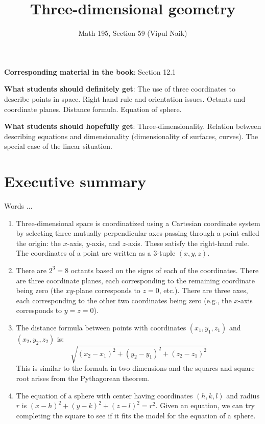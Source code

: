 \documentclass[10pt]{amsart}
\title{Three-dimensional geometry}
\author{Math 195, Section 59 (Vipul Naik)}
\begin{document}
\maketitle

{\bf Corresponding material in the book}: Section 12.1

{\bf What students should definitely get}: The use of three
coordinates to describe points in space. Right-hand rule and
orientation issues. Octants and coordinate planes. Distance
formula. Equation of sphere.

{\bf What students should hopefully get}:
Three-dimensionality. Relation between describing equations and
dimensionality (dimensionality of surfaces, curves). The special case
of the linear situation.

\section*{Executive summary}

Words ...

\begin{enumerate}
\item Three-dimensional space is coordinatized using a Cartesian
  coordinate system by selecting three mutually perpendicular axes
  passing through a point called the origin: the $x$-axis, $y$-axis,
  and $z$-axis. These satisfy the right-hand rule. The coordinates of
  a point are written as a $3$-tuple $(x,y,z)$.
\item There are $2^3 = 8$ octants based on the signs of each of the
  coordinates. There are three coordinate planes, each corresponding
  to the remaining coordinate being zero (the $xy$-plane corresponds
  to $z = 0$, etc.). There are three axes, each corresponding to the
  other two coordinates being zero (e.g., the $x$-axis corresponds to
  $y = z = 0$).
\item The distance formula between points with coordinates
  $(x_1,y_1,z_1)$ and $(x_2,y_2,z_2)$ is: $$\sqrt{(x_2 - x_1)^2 + (y_2
  - y_1)^2 + (z_2 - z_1)^2}$$ This is similar to the formula in two
  dimensions and the squares and square root arises from the
  Pythagorean theorem.
\item The equation of a sphere with center having coordinates
  $(h,k,l)$ and radius $r$ is $(x - h)^2 + (y - k)^2 + (z - l)^2 =
  r^2$. Given an equation, we can try completing the square to see if
  it fits the model for the equation of a sphere.
\end{enumerate}
\end{document}
